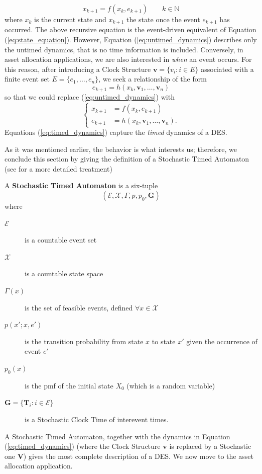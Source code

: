 \begin{equation}\label{eq:untimed_dynamics}
x_{k+1} = f(x_k,e_{k+1}) \qquad k \in \mathbb{N}
\end{equation}
where $x_k$ is the current state and $x_{k+1}$ the state once the event $e_{k+1}$ has occurred. The above recursive equation is the event-driven equivalent of Equation (\ref{eq:state_equation}). However, Equation (\ref{eq:untimed_dynamics}) describes only the untimed dynamics, that is no time information is included. Conversely, in asset allocation applications, we are also interested in \textit{when} an event occurs. For this reason, after introducing a Clock Structure $\bm{v} = \{v_i \colon i \in E\}$ associated with a finite event set $E = \{e_1,\ldots,e_n\}$, we seek a relationship of the form \[ e_{k+1} = h(x_k,\bm{v}_1,\ldots,\bm{v}_n)\] so that we could replace (\ref{eq:untimed_dynamics}) with
\begin{equation}\label{eq:timed_dynamics}
\begin{cases}
x_{k+1} & = f(x_k,e_{k+1})\\
e_{k+1} & = h(x_k,\bm{v}_1,\ldots,\bm{v}_n).
\end{cases}
\end{equation}
Equations (\ref{eq:timed_dynamics}) capture the \textit{timed} dynamics of a \gls{DES}.

As it was mentioned earlier, the  behavior is what interests us; therefore, we conclude this section by giving the definition of a Stochastic Timed Automaton (see \cite{cassandras2009} for a more detailed treatment)
\begin{definition}
	A \textbf{Stochastic Timed Automaton} is a six-tuple \[ (\mathcal{E},\mathcal{X},\Gamma,p,p_0,\bm{G})\]
	where 
	\begin{description}
		\item[$\mathcal{E}$] is a countable event set
		\item[$\mathcal{X}$] is a countable state space
		\item[$\Gamma(x)$] is the set of feasible events, defined $\forall x \in \mathcal{X}$
		\item[$p(x';x,e')$] is the transition probability from state $x$ to state $x'$ given the occurrence of event $e'$
		\item[$p_0(x)$] is the pmf of the initial state $X_0$ (which is a random variable)
		\item[$\bm{G}=\{\bm{T}_i \colon i \in \mathcal{E}\}$] is a Stochastic Clock Time of interevent times.
	\end{description}
\end{definition}
A Stochastic Timed Automaton, together with the dynamics in Equation (\ref{eq:timed_dynamics}) (where the Clock Structure $\bm{v}$ is replaced by a Stochastic one $\bm{V}$) gives the most complete description of a \gls{DES}. We now move to the asset allocation application.
